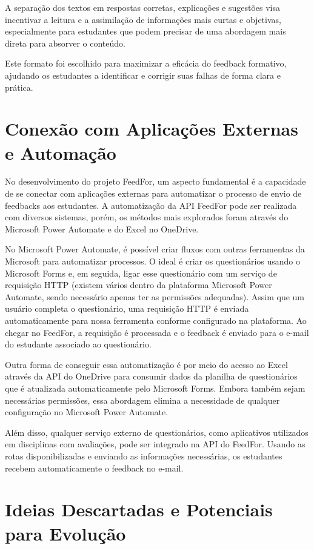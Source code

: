 A separação dos textos em respostas corretas, explicações e sugestões visa incentivar a leitura e a assimilação de informações mais curtas e objetivas, especialmente para estudantes que podem precisar de uma abordagem mais direta para absorver o conteúdo.

Este formato foi escolhido para maximizar a eficácia do feedback formativo, ajudando os estudantes a identificar e corrigir suas falhas de forma clara e prática.

\section{Conexão com Aplicações Externas e Automação}

No desenvolvimento do projeto FeedFor, um aspecto fundamental é a capacidade de se conectar com aplicações externas para automatizar o processo de envio de feedbacks aos estudantes. A automatização da API FeedFor pode ser realizada com diversos sistemas, porém, os métodos mais explorados foram através do Microsoft Power Automate e do Excel no OneDrive.

No Microsoft Power Automate, é possível criar fluxos com outras ferramentas da Microsoft para automatizar processos. O ideal é criar os questionários usando o Microsoft Forms e, em seguida, ligar esse questionário com um serviço de requisição HTTP (existem vários dentro da plataforma Microsoft Power Automate, sendo necessário apenas ter as permissões adequadas). Assim que um usuário completa o questionário, uma requisição HTTP é enviada automaticamente para nossa ferramenta conforme configurado na plataforma. Ao chegar no FeedFor, a requisição é processada e o feedback é enviado para o e-mail do estudante associado ao questionário.

Outra forma de conseguir essa automatização é por meio do acesso ao Excel através da API do OneDrive para consumir dados da planilha de questionários que é atualizada automaticamente pelo Microsoft Forms. Embora também sejam necessárias permissões, essa abordagem elimina a necessidade de qualquer configuração no Microsoft Power Automate.

Além disso, qualquer serviço externo de questionários, como aplicativos utilizados em disciplinas com avaliações, pode ser integrado na API do FeedFor. Usando as rotas disponibilizadas e enviando as informações necessárias, os estudantes recebem automaticamente o feedback no e-mail.

\section{Ideias Descartadas e Potenciais para Evolução}

